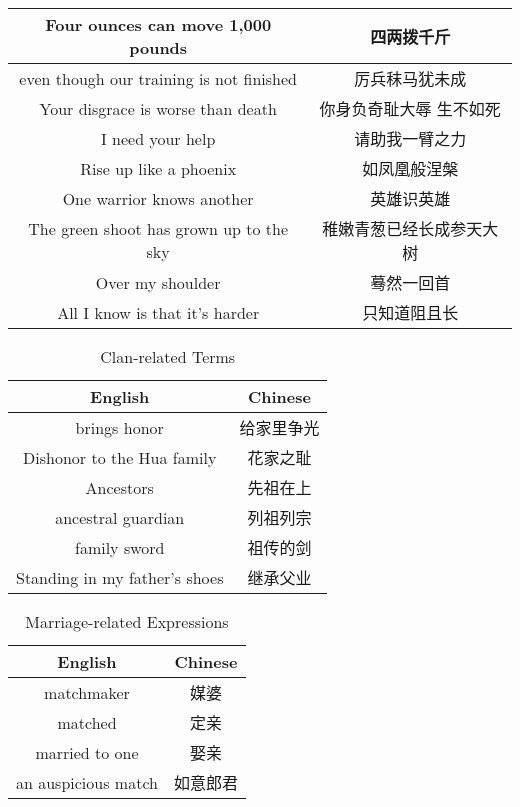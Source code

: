 \begin{table}[!ht]
\begin{tabular}{|c|c|}
        Four ounces can move 1,000 pounds & 四两拨千斤 \\ \hline
        even though our training is not finished & 厉兵秣马犹未成 \\ \hline
        Your disgrace is worse than death & 你身负奇耻大辱  生不如死 \\ \hline
        I need your help & 请助我一臂之力 \\ \hline
        Rise up like a phoenix & 如凤凰般涅槃 \\ \hline
        One warrior knows another & 英雄识英雄 \\ \hline
        The green shoot has grown up to the sky & 稚嫩青葱已经长成参天大树 \\ \hline
        Over my shoulder & 蓦然一回首 \\ \hline
        All I know is that it's harder & 只知道阻且长 \\ \hline
    \end{tabular}
\end{table}

\begin{table}[!ht]
    \centering
    \caption{Clan-related Terms}
    \begin{tabular}{|c|c|}
    \hline
        \textbf{English} & \textbf{Chinese} \\ \hline
        brings honor & 给家里争光 \\ \hline
        Dishonor to the Hua family & 花家之耻 \\ \hline
        Ancestors & 先祖在上 \\ \hline
        ancestral guardian & 列祖列宗 \\ \hline
        family sword & 祖传的剑 \\ \hline
        Standing in my father's shoes & 继承父业 \\ \hline
    \end{tabular}
\end{table}

\begin{table}[!ht]
    \centering
    \caption{Marriage-related Expressions}
    \begin{tabular}{|c|c|}
    \hline
    \textbf{English} & \textbf{Chinese} \\ \hline
        matchmaker & 媒婆 \\ \hline
        matched & 定亲 \\ \hline
        married to one & 娶亲 \\ \hline
        an auspicious match & 如意郎君 \\ \hline
    \end{tabular}
\end{table}

